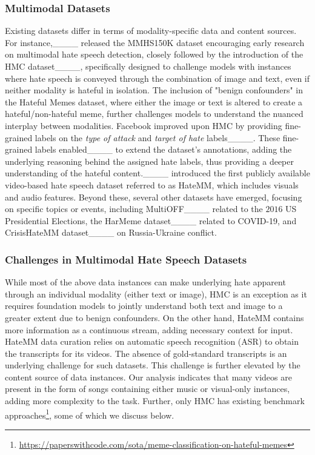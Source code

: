 \subsubsection{Multimodal Datasets}
Existing datasets differ in terms of modality-specific data and content sources. For instance,____ released the MMHS150K dataset encouraging early research on multimodal hate speech detection, closely followed by the introduction of the HMC dataset____, specifically designed to challenge models with instances where hate speech is conveyed through the combination of image and text, even if neither modality is hateful in isolation. The inclusion of "benign confounders" in the Hateful Memes dataset, where either the image or text is altered to create a hateful/non-hateful meme, further challenges models to understand the nuanced interplay between modalities. Facebook improved upon HMC by providing fine-grained labels on the \textit{type of attack} and \textit{target of hate} labels____. These fine-grained labels enabled____ to extend the dataset's annotations, adding the underlying reasoning behind the assigned hate labels, thus providing a deeper understanding of the hateful content.____ introduced the first publicly available video-based hate speech dataset referred to as HateMM, which includes visuals and audio features. Beyond these, several other datasets have emerged, focusing on specific topics or events, including MultiOFF____ related to the $2016$ US Presidential Elections, the HarMeme dataset____ related to COVID-19, and CrisisHateMM dataset____ on Russia-Ukraine conflict. 

\subsubsection{Challenges in Multimodal Hate Speech Datasets}
While most of the above data instances can make underlying hate apparent through an individual modality (either text or image), HMC is an exception as it requires foundation models to jointly understand both text and image to a greater extent due to benign confounders. On the other hand, HateMM contains more information as a continuous stream, adding necessary context for input. HateMM data curation relies on automatic speech recognition (ASR) to obtain the transcripts for its videos. The absence of gold-standard transcripts is an underlying challenge for such datasets. This challenge is further elevated by the content source of data instances. Our analysis indicates that many videos are present in the form of songs containing either music or visual-only instances, adding more complexity to the task. Further, only HMC has existing benchmark approaches\footnote{\url{https://paperswithcode.com/sota/meme-classification-on-hateful-memes}}, some of which we discuss below.

